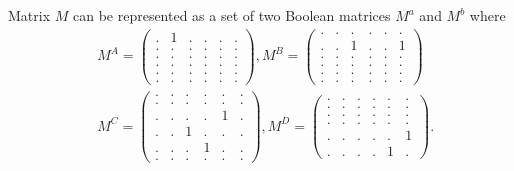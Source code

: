 Matrix $M$ can be represented as a set of two Boolean matrices $M^a$ and $M^b$ where
\begin{align}
& M^{A} =    
\begin{pmatrix}
    .     &   1   &   .   &   .   &   .   &   .   \\
    .     &   .   &   .   &   .   &   .   &   .   \\
    .     &   .   &   .   &   .   &   .   &   .   \\
    .     &   .   &   .   &   .   &   .   &   .   \\
    .     &   .   &   .   &   .   &   .   &   .   \\
    .     &   .   &   .   &   .   &   .   &   .
\end{pmatrix}, 
M^{B} =
\begin{pmatrix}
    .     &   .   &   .   &   .   &   .   &   .   \\
    .     &   .   &   1   &   .   &   .   &   1   \\
    .     &   .   &   .   &   .   &   .   &   .   \\
    .     &   .   &   .   &   .   &   .   &   .   \\
    .     &   .   &   .   &   .   &   .   &   .   \\
    .     &   .   &   .   &   .   &   .   &   .
\end{pmatrix} \\
& M^{C} =
\begin{pmatrix}
    .     &   .   &   .   &   .   &   .   &   .   \\
    .     &   .   &   .   &   .   &   .   &   .   \\
    .     &   .   &   .   &   .   &   1   &   .   \\
    .     &   .   &   1   &   .   &   .   &   .   \\
    .     &   .   &   .   &   1   &   .   &   .   \\
    .     &   .   &   .   &   .   &   .   &   .
\end{pmatrix},
M^{D} =
\begin{pmatrix}
    .     &   .   &   .   &   .   &   .   &   .   \\
    .     &   .   &   .   &   .   &   .   &   .   \\
    .     &   .   &   .   &   .   &   .   &   .   \\
    .     &   .   &   .   &   .   &   .   &   .   \\
    .     &   .   &   .   &   .   &   .   &   1   \\
    .     &   .   &   .   &   .   &   1   &   .
\end{pmatrix}.
\label{eq:boolean_decomposition_of_graph}
\end{align}

